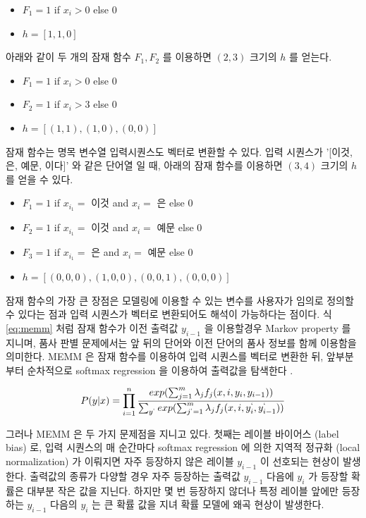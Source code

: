 \documentclass[11pt]{article}
\begin{document}
\begin{itemize}[noitemsep]
  \item $F_1 = 1$ if $x_i > 0$ else $0$
  \item $h = [1, 1, 0]$
\end{itemize}

아래와 같이 두 개의 잠재 함수 $F_1, F_2$ 를 이용하면 $(2, 3)$ 크기의 $h$ 를 얻는다.

\begin{itemize}[noitemsep]
  \item $F_1 = 1$ if $x_i > 0$ else $0$
  \item $F_2 = 1$ if $x_i > 3$ else $0$
  \item $h = [(1, 1), (1, 0), (0, 0)]$
\end{itemize}

잠재 함수는 명목 변수열 입력시퀀스도 벡터로 변환할 수 있다.
입력 시퀀스가 '[이것, 은, 예문, 이다]' 와 같은 단어열 일 때, 아래의 잠재 함수를 이용하면 $(3, 4)$ 크기의 $h$ 를 얻을 수 있다.

\begin{itemize}[noitemsep]
  \item $F_1 = 1$ if $x_{i_1} =$ 이것 and $x_{i} =$ 은 else $0$
  \item $F_2 = 1$ if $x_{i_1} =$ 이것 and $x_{i} =$ 예문 else $0$
  \item $F_3 = 1$ if $x_{i_1} =$ 은 and $x_{i} =$ 예문 else $0$
  \item $h = [(0, 0, 0), (1, 0, 0), (0, 0, 1), (0, 0, 0)]$
\end{itemize}

잠재 함수의 가장 큰 장점은 모델링에 이용할 수 있는 변수를 사용자가 임의로 정의할 수 있다는 점과 입력 시퀀스가 벡터로 변환되어도 해석이 가능하다는 점이다.
식 \ref{eq:memm} 처럼 잠재 함수가 이전 출력값 $y_{i-1}$ 을 이용할경우 Markov property 를 지니며, 품사 판별 문제에서는 앞 뒤의 단어와 이전 단어의 품사 정보를 함께 이용함을 의미한다.
MEMM 은 잠재 함수를 이용하여 입력 시퀀스를 벡터로 변환한 뒤, 앞부분부터 순차적으로 softmax regression 을 이용하여 출력값을 탐색한다 \citep{mccallum2000maximum}.

\begin{equation}
  \label{eq:memm}
  P(y \vert x) = \prod_{i=1}^{n} \frac{exp(\sum_{j=1}^{m} \lambda_j f_j (x, i, y_i, y_{i-1}))}{ \sum_{y^{`}} exp(\sum_{j^{`}=1}^{m} \lambda_j f_j (x, i, y_i^{`}, y_{i-1}^{`})) }
\end{equation}

그러나 MEMM 은 두 가지 문제점을 지니고 있다.
첫째는 레이블 바이어스 (label bias) 로, 입력 시퀀스의 매 순간마다 softmax regression 에 의한 지역적 정규화 (local normalization) 가 이뤄지면 자주 등장하지 않은 레이블 $y_{i-1}$ 이 선호되는 현상이 발생한다\citep{lafferty2001conditional, kudo2004applying, andor2016globally}.
출력값의 종류가 다양할 경우 자주 등장하는 출력값 $y_{i-1}$ 다음에 $y_i$ 가 등장할 확률은 대부분 작은 값을 지닌다.
하지만 몇 번 등장하지 않더나 특정 레이블 앞에만 등장하는 $y_{i-1}$ 다음의 $y_i$ 는 큰 확률 값을 지녀 확률 모델에 왜곡 현상이 발생한다.
\end{document}
